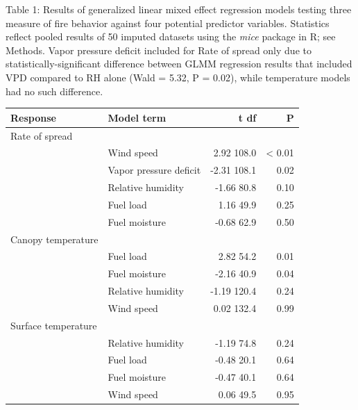 \documentclass[
]{article}
\author{}
\date{\vspace{-2.5em}}
\begin{document}
Table 1: Results of generalized linear mixed effect regression models
testing three measure of fire behavior against four potential predictor
variables. Statistics reflect pooled results of 50 imputed datasets
using the \emph{mice} package in R; see Methods. Vapor pressure deficit
included for Rate of spread only due to statistically-significant
difference between GLMM regression results that included VPD compared to
RH alone (Wald = 5.32, P = 0.02), while temperature models had no such
difference.

\begin{longtable}[]{@{}llrr@{}}
\toprule
Response & Model term & t df & P \\
\midrule
\endhead
Rate of spread & & & \\
& Wind speed & 2.92 108.0 & \textless{} 0.01 \\
& Vapor pressure deficit & -2.31 108.1 & 0.02 \\
& Relative humidity & -1.66 80.8 & 0.10 \\
& Fuel load & 1.16 49.9 & 0.25 \\
& Fuel moisture & -0.68 62.9 & 0.50 \\
Canopy temperature & & & \\
& Fuel load & 2.82 54.2 & 0.01 \\
& Fuel moisture & -2.16 40.9 & 0.04 \\
& Relative humidity & -1.19 120.4 & 0.24 \\
& Wind speed & 0.02 132.4 & 0.99 \\
Surface temperature & & & \\
& Relative humidity & -1.19 74.8 & 0.24 \\
& Fuel load & -0.48 20.1 & 0.64 \\
& Fuel moisture & -0.47 40.1 & 0.64 \\
& Wind speed & 0.06 49.5 & 0.95 \\
\bottomrule
\end{longtable}
\end{document}
